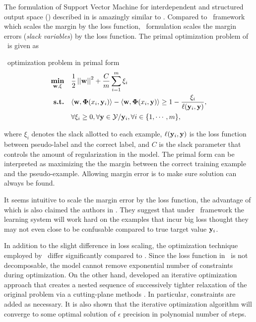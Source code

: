 The formulation of Support Vector Machine for interdependent and structured output space (\svmstruct) described in \citep{THJA04,TJTA05} is amazingly similar to \mmmn.
Compared to \mmmn\ framework which scales the margin by the loss function, \svmstruct\ formulation scales the margin errors ({\em slack variables}) by the loss function.
The primal optimization problem of \svmstruct\ is given as
\begin{definition}{\svmstruct\ optimization problem in primal form}\label{def_svmstruct}
	\begin{align*}
		\underset{\mathbf {w},\mathbf{\xi}}{\textbf{min}} & \quad\frac{1}{2}\left|\left| \mathbf {w} \right|\right|^2 + \frac{C}{m}\sum_{i=1}^{m}\xi_i \\
		\textbf{s.t.} & \quad\langle \mathbf {w}, \mathbf{\Phi}(x_i,\mathbf {y}_i) \rangle - \langle \mathbf {w}, \mathbf{\Phi}(x_i,\mathbf {y}) \rangle \ge 1-\frac{\xi_i}{\mathbf {\ell}(\mathbf {y}_i,\mathbf {y})},\\
		& \quad \forall \xi_i\ge0, \forall \mathbf {y}\in\mathcal{Y}/\mathbf {y}_i, \forall i\in\{1,\cdots,m\},
	\end{align*}
\end{definition}
where $\xi_i$ denotes the slack allotted to each example, $\mathbf {\ell}(\mathbf {y}_i,\mathbf {y})$ is the loss function between pseudo-label and the correct label, and $C$ is the slack parameter that controls the amount of regularization in the model.
The primal form can be interpreted as maximizing the the margin between the correct training example and the pseudo-example.
Allowing margin error is to make sure solution can always be found.

It seems intuitive to scale the margin error by the loss function, the advantage of which is also claimed the authors in \citep[p.3]{THJA04}.
They suggest that under \mmmn\ framework the learning system will work hard on the examples that incur big loss thought they may not even close to be confusable compared to true target value $\mathbf {y}_i$.

In addition to the slight difference in loss scaling, the optimization technique employed by \svmstruct\ differ significantly compared to \mmmn.
Since the loss function in \svmstruct\ is not decomposable, the model cannot remove exponential number of constraints during optimization.
On the other hand, \citet{THJA04} developed an iterative optimization approach that creates a nested sequence of successively tighter relaxation of the original problem via a cutting-plane methods \citep{Bishop07,JFY09}.
In particular, constraints are added as necessary.
It is also shown that the iterative optimization algorithm will converge to some optimal solution of $\epsilon$ precision in polynomial number of steps.

